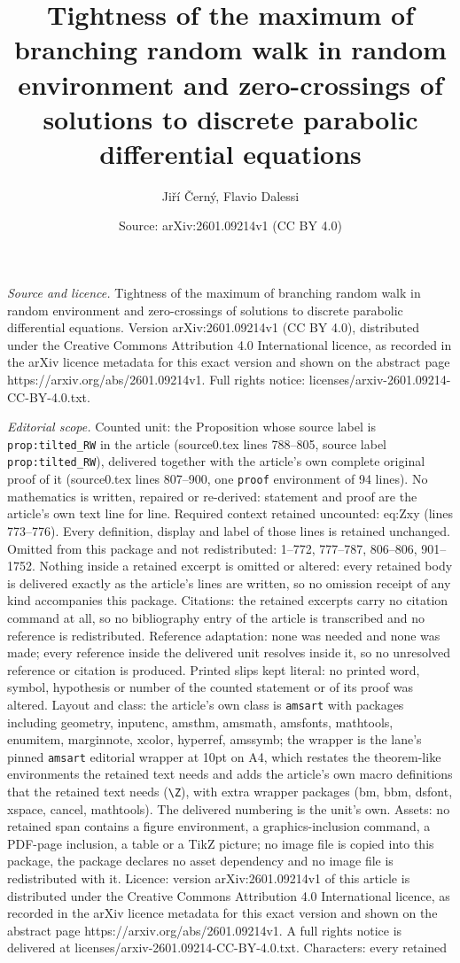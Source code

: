 \documentclass[10pt,a4paper]{amsart}
\title[Tightness of the maximum of branching random walk in random ]{Tightness of the maximum of branching random walk in random environment and zero-crossings of solutions to discrete parabolic differential equations}
\author{Ji\v{r}\'i \v{C}ern\'y, Flavio Dalessi}
\date{Source: arXiv:2601.09214v1 (CC BY 4.0)}
\begin{document}
\maketitle

\noindent\emph{Source and licence.} Tightness of the maximum of branching random walk in random environment and zero-crossings of solutions to discrete parabolic differential equations. Version arXiv:2601.09214v1 (CC BY 4.0), distributed under the Creative Commons Attribution 4.0 International licence, as recorded in the arXiv licence metadata for this exact version and shown on the abstract page https://arxiv.org/abs/2601.09214v1. Full rights notice: licenses/arxiv-2601.09214-CC-BY-4.0.txt.\par\smallskip

\noindent\textit{Editorial scope.} Counted unit: the Proposition whose source label is \texttt{prop:tilted\_RW} in the article (source0.tex lines 788--805, source label \texttt{prop:tilted\_RW}), delivered together with the article's own complete original proof of it (source0.tex lines 807--900, one \texttt{proof} environment of 94 lines). No mathematics is written, repaired or re-derived: statement and proof are the article's own text line for line. Required context retained uncounted: eq:Zxy (lines 773--776). Every definition, display and label of those lines is retained unchanged. Omitted from this package and not redistributed: 1--772, 777--787, 806--806, 901--1752. Nothing inside a retained excerpt is omitted or altered: every retained body is delivered exactly as the article's lines are written, so no omission receipt of any kind accompanies this package. Citations: the retained excerpts carry no citation command at all, so no bibliography entry of the article is transcribed and no reference is redistributed. Reference adaptation: none was needed and none was made; every reference inside the delivered unit resolves inside it, so no unresolved reference or citation is produced. Printed slips kept literal: no printed word, symbol, hypothesis or number of the counted statement or of its proof was altered. Layout and class: the article's own class is \texttt{amsart} with packages including geometry, inputenc, amsthm, amsmath, amsfonts, mathtools, enumitem, marginnote, xcolor, hyperref, amssymb; the wrapper is the lane's pinned \texttt{amsart} editorial wrapper at 10pt on A4, which restates the theorem-like environments the retained text needs and adds the article's own macro definitions that the retained text needs (\texttt{\textbackslash Z}), with extra wrapper packages (bm, bbm, dsfont, xspace, cancel, mathtools). The delivered numbering is the unit's own. Assets: no retained span contains a figure environment, a graphics-inclusion command, a PDF-page inclusion, a table or a TikZ picture; no image file is copied into this package, the package declares no asset dependency and no image file is redistributed with it. Licence: version arXiv:2601.09214v1 of this article is distributed under the Creative Commons Attribution 4.0 International licence, as recorded in the arXiv licence metadata for this exact version and shown on the abstract page https://arxiv.org/abs/2601.09214v1. A full rights notice is delivered at licenses/arxiv-2601.09214-CC-BY-4.0.txt. Characters: every retained 
\end{document}
